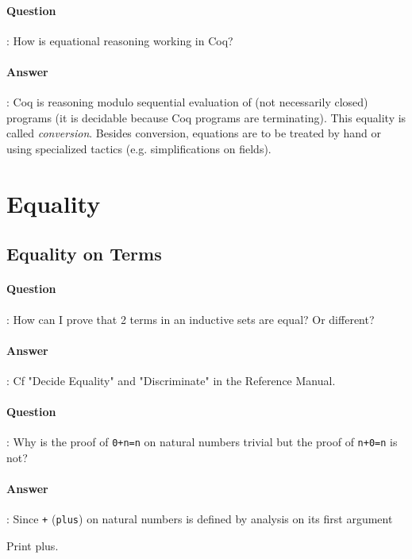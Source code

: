 \documentclass{article}
\newcommand{\coqtt}[1]{{\tt #1}}
\begin{document}
\paragraph{Question}: How is equational reasoning working in Coq?

\paragraph{Answer}: Coq is reasoning modulo sequential evaluation of
(not necessarily closed) programs (it is decidable because Coq
programs are terminating). This equality is called {\em conversion}.
Besides conversion, equations are to be treated by hand or using
specialized tactics (e.g. simplifications on fields).

\section{Equality}

\subsection{Equality on Terms}

\paragraph{Question}: How can I prove that 2 terms in an inductive sets are equal? Or different?

\paragraph{Answer}: Cf "Decide Equality" and "Discriminate" in the Reference Manual.

\paragraph{Question}: Why is the proof of \coqtt{0+n=n} on natural numbers
trivial but the proof of \coqtt{n+0=n} is not?

\paragraph{Answer}: Since \coqtt{+} (\coqtt{plus}) on natural numbers is defined by analysis on its first argument

\begin{coq_example}
Print plus.
\end{coq_example}
\end{document}
